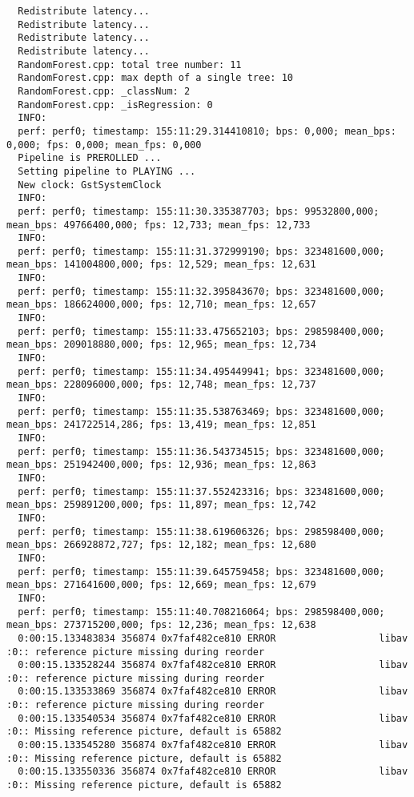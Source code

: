 \documentclass[12pt,oneside]{book}
\begin{document}
\begin{lstlisting}
  Redistribute latency...
  Redistribute latency...
  Redistribute latency...
  Redistribute latency...
  RandomForest.cpp: total tree number: 11
  RandomForest.cpp: max depth of a single tree: 10
  RandomForest.cpp: _classNum: 2
  RandomForest.cpp: _isRegression: 0
  INFO:
  perf: perf0; timestamp: 155:11:29.314410810; bps: 0,000; mean_bps: 0,000; fps: 0,000; mean_fps: 0,000
  Pipeline is PREROLLED ...
  Setting pipeline to PLAYING ...
  New clock: GstSystemClock
  INFO:
  perf: perf0; timestamp: 155:11:30.335387703; bps: 99532800,000; mean_bps: 49766400,000; fps: 12,733; mean_fps: 12,733
  INFO:
  perf: perf0; timestamp: 155:11:31.372999190; bps: 323481600,000; mean_bps: 141004800,000; fps: 12,529; mean_fps: 12,631
  INFO:
  perf: perf0; timestamp: 155:11:32.395843670; bps: 323481600,000; mean_bps: 186624000,000; fps: 12,710; mean_fps: 12,657
  INFO:
  perf: perf0; timestamp: 155:11:33.475652103; bps: 298598400,000; mean_bps: 209018880,000; fps: 12,965; mean_fps: 12,734
  INFO:
  perf: perf0; timestamp: 155:11:34.495449941; bps: 323481600,000; mean_bps: 228096000,000; fps: 12,748; mean_fps: 12,737
  INFO:
  perf: perf0; timestamp: 155:11:35.538763469; bps: 323481600,000; mean_bps: 241722514,286; fps: 13,419; mean_fps: 12,851
  INFO:
  perf: perf0; timestamp: 155:11:36.543734515; bps: 323481600,000; mean_bps: 251942400,000; fps: 12,936; mean_fps: 12,863
  INFO:
  perf: perf0; timestamp: 155:11:37.552423316; bps: 323481600,000; mean_bps: 259891200,000; fps: 11,897; mean_fps: 12,742
  INFO:
  perf: perf0; timestamp: 155:11:38.619606326; bps: 298598400,000; mean_bps: 266928872,727; fps: 12,182; mean_fps: 12,680
  INFO:
  perf: perf0; timestamp: 155:11:39.645759458; bps: 323481600,000; mean_bps: 271641600,000; fps: 12,669; mean_fps: 12,679
  INFO:
  perf: perf0; timestamp: 155:11:40.708216064; bps: 298598400,000; mean_bps: 273715200,000; fps: 12,236; mean_fps: 12,638
  0:00:15.133483834 356874 0x7faf482ce810 ERROR                  libav :0:: reference picture missing during reorder
  0:00:15.133528244 356874 0x7faf482ce810 ERROR                  libav :0:: reference picture missing during reorder
  0:00:15.133533869 356874 0x7faf482ce810 ERROR                  libav :0:: reference picture missing during reorder
  0:00:15.133540534 356874 0x7faf482ce810 ERROR                  libav :0:: Missing reference picture, default is 65882
  0:00:15.133545280 356874 0x7faf482ce810 ERROR                  libav :0:: Missing reference picture, default is 65882
  0:00:15.133550336 356874 0x7faf482ce810 ERROR                  libav :0:: Missing reference picture, default is 65882

\end{lstlisting}
\end{document}
